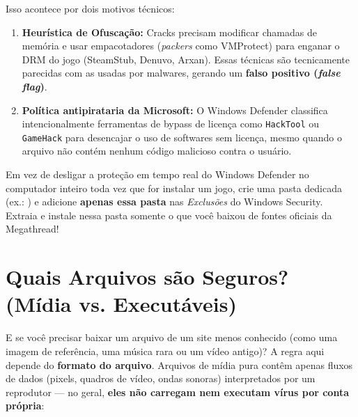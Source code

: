 \documentclass{pousadaguide}
\begin{document}
Isso acontece por dois motivos técnicos:
\begin{enumerate}
  \item \textbf{Heurística de Ofuscação:} Cracks precisam modificar chamadas de memória e usar empacotadores (\emph{packers} como VMProtect) para enganar o DRM do jogo (SteamStub, Denuvo, Arxan). Essas técnicas são tecnicamente parecidas com as usadas por malwares, gerando um \textbf{falso positivo (\emph{false flag})}.
  \item \textbf{Política antipirataria da Microsoft:} O Windows Defender classifica intencionalmente ferramentas de bypass de licença como \texttt{HackTool} ou \texttt{GameHack} para desencajar o uso de softwares sem licença, mesmo quando o arquivo não contém nenhum código malicioso contra o usuário.
\end{enumerate}

\begin{dica}
Em vez de desligar a proteção em tempo real do Windows Defender no computador inteiro toda vez que for instalar um jogo, crie uma pasta dedicada (ex.: ) e adicione \textbf{apenas essa pasta} nas \emph{Exclusões} do Windows Security. Extraia e instale nessa pasta somente o que você baixou de fontes oficiais da Megathread!
\end{dica}

\section{Quais Arquivos são Seguros? (Mídia vs. Executáveis)}

E se você precisar baixar um arquivo de um site menos conhecido (como uma imagem de referência, uma música rara ou um vídeo antigo)? A regra aqui depende do \textbf{formato do arquivo}. Arquivos de mídia pura contêm apenas fluxos de dados (pixels, quadros de vídeo, ondas sonoras) interpretados por um reprodutor — no geral, \textbf{eles não carregam nem executam vírus por conta própria}:
\end{document}
